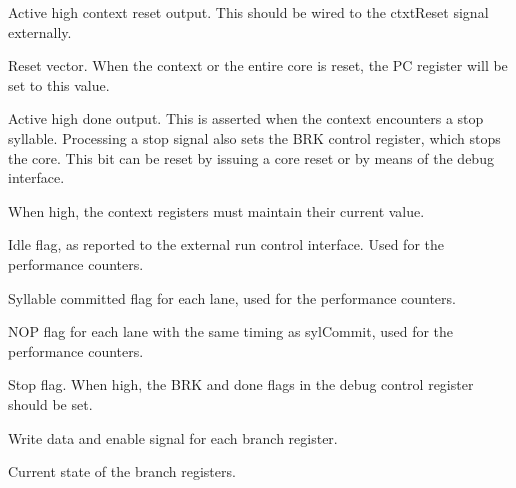 
\contextInterface{}

\ifaceSubGroup{}
Active high context reset output. This should be wired to the ctxtReset signal
externally.
    
\ifaceSubGroup{}
Reset vector. When the context or the entire core is reset, the PC register will 
be set to this value.
    
\ifaceSubGroup{}
Active high done output. This is asserted when the context encounters a stop 
syllable. Processing a stop signal also sets the BRK control register, which 
stops the core. This bit can be reset by issuing a core reset or by means of the 
debug interface.

\ifaceSubGroup{}
When high, the context registers must maintain their current value.

\ifaceSubGroup{}
Idle flag, as reported to the external run control interface. Used for the 
performance counters.

\ifaceSubGroup{}
Syllable committed flag for each lane, used for the performance counters.
    
\ifaceSubGroup{}
NOP flag for each lane with the same timing as sylCommit, used for the 
performance counters.

\ifaceSubGroup{}
Stop flag. When high, the BRK and done flags in the debug control
register should be set.
    
\ifaceSubGroup{}
Write data and enable signal for each branch register.
    
\ifaceSubGroup{}
Current state of the branch registers.
    
